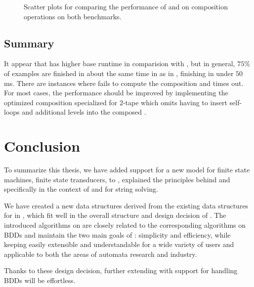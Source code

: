 \begin{figure}[ht]
    \centering
    \quad
    \caption{
      Scatter plots for comparing the performance of \mata and \mona on composition operations on both benchmarks.
    }
    \label{fig:composition}%
\end{figure}

\section{Summary}

It appear that \mata has higher base runtime in comparision with \mona, but in general, $75 \%$ of examples are finished in about the same time in \mata as in \mona, finishing in under $50$ ms.
There are instances where \mata fails to compute the composition and times out.
For most cases, the performance should be improved by implementing the optimized composition specialized for $2$-tape \nfts which omits having to insert self-loops and additional levels into the composed \nfts.

\chapter{Conclusion}

To summarize this thesis, we have added support for a new model for finite state machines, finite state transducers, to \mata, explained the principles behind \nfts and specifically \nfts in the context of \mata and \noodler for string solving.

We have created a new data structures derived from the existing data structures for \nfas in \mata, which fit well in the overall structure and design decision of \mata.
The introduced algorithms on \nfts are closely related to the corresponding algorithms on BDDs and maintain the two main goals of \mata: simplicity and efficiency, while keeping \mata easily extensible and understandable for a wide variety of users and applicable to both the areas of automata research and industry.

Thanks to these design decision, further extending \mata with support for handling BDDs will be effortless.

